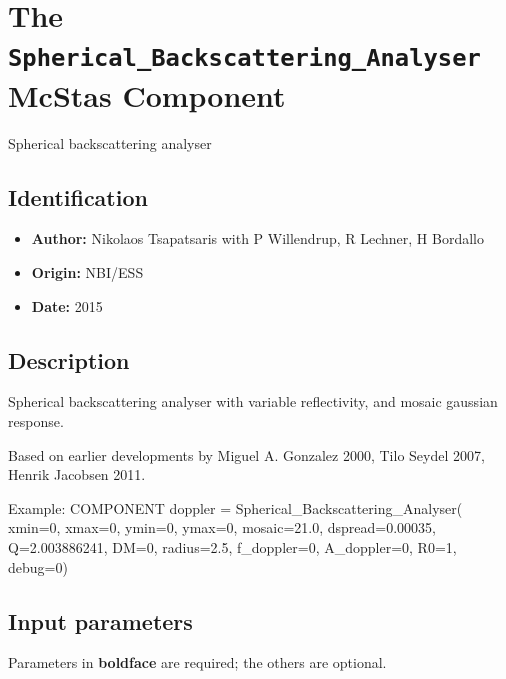 \section{The \texttt{Spherical\_Backscattering\_Analyser} McStas Component}
Spherical backscattering analyser

\subsection*{Identification}
\begin{itemize}
  \item \textbf{Author:} Nikolaos Tsapatsaris with P Willendrup, R Lechner, H Bordallo
  \item \textbf{Origin:} NBI/ESS
  \item \textbf{Date:} 2015
\end{itemize}

\subsection*{Description}
Spherical backscattering analyser with variable reflectivity, and mosaic gaussian response.

Based on earlier developments by Miguel A. Gonzalez 2000, Tilo Seydel 2007, Henrik Jacobsen 2011.

Example: COMPONENT doppler = Spherical\_Backscattering\_Analyser( xmin=0, xmax=0, ymin=0, ymax=0, mosaic=21.0, dspread=0.00035, Q=2.003886241, DM=0, radius=2.5, f\_doppler=0, A\_doppler=0, R0=1, debug=0)

\subsection*{Input parameters}
Parameters in \textbf{boldface} are required; the others are optional.

